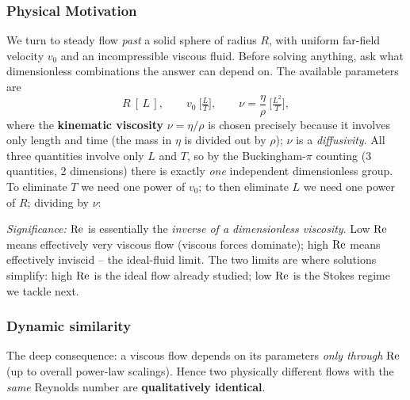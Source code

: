 \documentclass[../main.tex]{subfiles}
\begin{document}
\subsubsection*{Physical Motivation}
We turn to steady flow \emph{past} a solid sphere of radius $R$, with uniform far-field velocity $v_0$ and an incompressible viscous fluid. Before solving anything, ask what dimensionless combinations the answer can depend on. The available parameters are
\begin{equation}
  R\ [\,L\,],\qquad v_0\ \Big[\tfrac{L}{T}\Big],\qquad
  \nu=\frac{\eta}{\rho}\ \Big[\tfrac{L^2}{T}\Big],
  \label{eq:lec20_params}
\end{equation}
where the \textbf{kinematic viscosity} $\nu=\eta/\rho$ is chosen precisely because it involves only length and time (the mass in $\eta$ is divided out by $\rho$); $\nu$ is a \emph{diffusivity}. All three quantities involve only $L$ and $T$, so by the Buckingham-$\pi$ counting (3 quantities, 2 dimensions) there is exactly \emph{one} independent dimensionless group. To eliminate $T$ we need one power of $v_0$; to then eliminate $L$ we need one power of $R$; dividing by $\nu$:

\textit{Significance:} $\mathrm{Re}$ is essentially the \emph{inverse of a dimensionless viscosity}. Low $\mathrm{Re}$ means effectively very viscous flow (viscous forces dominate); high $\mathrm{Re}$ means effectively inviscid -- the ideal-fluid limit. The two limits are where solutions simplify: high $\mathrm{Re}$ is the ideal flow already studied; low $\mathrm{Re}$ is the Stokes regime we tackle next.


\subsubsection*{Dynamic similarity}
The deep consequence: a viscous flow depends on its parameters \emph{only through} $\mathrm{Re}$ (up to overall power-law scalings). Hence two physically different flows with the \emph{same} Reynolds number are \textbf{qualitatively identical}.
\end{document}
